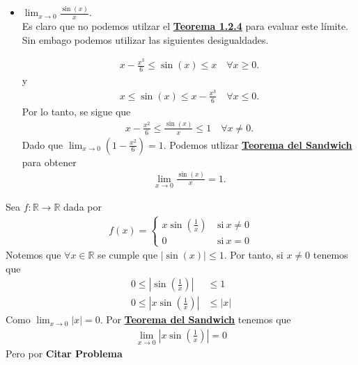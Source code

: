 \documentclass[12pt]{book}
\begin{document}
\begin{eje}{}{}
\begin{itemize}
    \item $\displaystyle \lim_{x\to 0}\frac{\sin(x)}{x}$. \\
    
    Es claro que no podemos utilzar el \hyperref[th:teo1.2.4]{\textbf{Teorema 1.2.4}} para evaluar este límite. Sin embago podemos utilizar las siguientes desigualdades.

    \begin{align*}
        x-\frac{x^3}{6}\leq \sin(x)\leq x \quad \forall x \geq 0.
    \end{align*}
    y 
    \begin{align*}
        x \leq \sin(x)\leq x - \frac{x^3}{6} \quad \forall x \leq 0.
    \end{align*}
    Por lo tanto, se sigue que 
    \begin{align*}
        x-\frac{x^2}{6} \leq \frac{\sin(x)}{x}\leq 1 \quad \forall x \neq 0.
    \end{align*}
    Dado que $\displaystyle \lim_{x \to 0}(1-\frac{x^2}{6})=1$. Podemos utlizar \hyperref[th:teosand]{\textbf{Teorema del Sandwich}} para obtener
    \begin{align*}
        \lim_{x\to 0}\frac{\sin(x)}{x}=1.
    \end{align*}
    \end{itemize}
\end{eje}

\begin{eje}{}{}
    Sea $f : \mathbb{R} \to \mathbb{R}$ dada por 
    \begin{align*}
        f(x)=\begin{cases}
            \displaystyle x\sin\left( \frac{1}{x}\right) \ &\text{si} \ x\neq 0 \\
            0 &\text{si} \ x=0
        \end{cases}
    \end{align*}
    Notemos que $\forall x \in \mathbb{R}$ se cumple que $|\sin(x)|\leq 1$. Por tanto, si $x\neq 0$ tenemos que 
    \begin{align*}
        0\leq \left|\sin\left( \frac{1}{x}\right) \right|&\leq 1 \\
        0 \leq  \left|x\sin\left( \frac{1}{x}\right) \right|&\leq |x|
    \end{align*}
    Como $\displaystyle \lim_{x \to 0} |x| = 0$. Por \hyperref[th:teosand]{\textbf{Teorema del Sandwich}} tenemos que 
    \begin{align*}
        \lim_{x\to0}\left|x\sin\left( \frac{1}{x}\right) \right|=0
    \end{align*}
    Pero por {\Large \textbf{Citar Problema}}
\end{eje}
\end{document}
